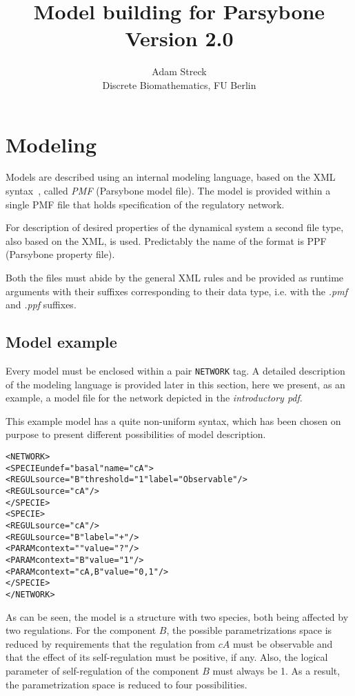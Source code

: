 \documentclass[12pt]{article}
\title{Model building for Parsybone \\ Version 2.0}
\author{Adam Streck \\
		Discrete Biomathematics, FU Berlin}
\begin{document}
\maketitle

\section{Modeling}
\label{sec:modeling}
 Models are described using an internal modeling language, based on the XML syntax~\cite{XML}, called \emph{PMF} (Parsybone model file). The model is provided within a single PMF file that holds specification of the regulatory network. 
 
For description of desired properties of the dynamical system a second file type, also based on the XML, is used. Predictably the name of the format is PPF (Parsybone property file).

Both the files must abide by the general XML rules and be provided as runtime arguments with their suffixes corresponding to their data type, i.e. with the \emph{.pmf} and \emph{.ppf} suffixes.

\subsection{Model example}
Every model must be enclosed within a pair \texttt{NETWORK} tag. A detailed description of the modeling language is provided later in this section, here we present, as an example, a model file for the network depicted in the \emph{introductory pdf}. 

This example model has a quite non-uniform syntax, which has been chosen on purpose to present different possibilities of model description.
\begin{alltt}
<NETWORK>
    <SPECIE undef="basal" name="cA">
        <REGUL source="B" threshold ="1" label="Observable" />
        <REGUL source="cA" />            
    </SPECIE>
    <SPECIE>
        <REGUL source="cA" />
        <REGUL source="B" label="+" />            
        <PARAM context="" value="?" />
        <PARAM context="B" value="1" />
        <PARAM context="cA,B" value="0,1" />          
    </SPECIE>
</NETWORK>
\end{alltt}
As can be seen, the model is a structure with two species, both being affected by two regulations. For the component $B$, the possible parametrizations space is reduced by requirements that the regulation from $cA$ must be observable and that the effect of its self-regulation must be positive, if any. Also, the logical parameter of self-regulation of the component $B$ must always be 1. As a result, the parametrization space is reduced to four possibilities.
\end{document}
